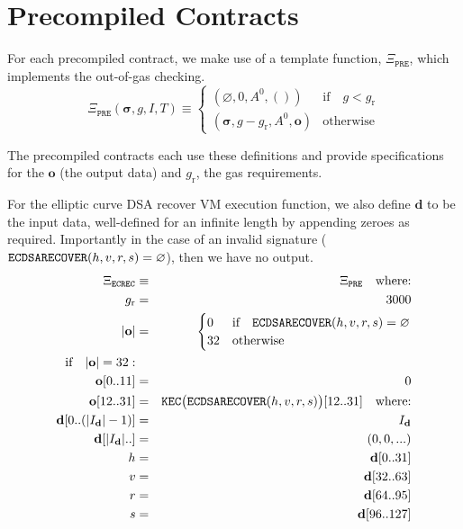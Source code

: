 \documentclass[9pt,oneside]{amsart}
\begin{document}
\section{Precompiled Contracts}\label{app:precompiled}

For each precompiled contract, we make use of a template function, $\Xi_{\mathtt{PRE}}$, which implements the out-of-gas checking.
\begin{equation} \label{eq:pre}
\Xi_{\mathtt{PRE}}(\boldsymbol{\sigma}, g, I, T) \equiv \begin{cases}
(\varnothing, 0, A^0, ()) & \text{if} \quad g < g_{\mathrm{r}} \\
(\boldsymbol\sigma, g - g_{\mathrm{r}}, A^0, \mathbf{o}) & \text{otherwise}\end{cases}
\end{equation}

The precompiled contracts each use these definitions and provide specifications for the $\mathbf{o}$ (the output data) and $g_{\mathrm{r}}$, the gas requirements.

For the elliptic curve DSA recover VM execution function, we also define $\mathbf{d}$ to be the input data, well-defined for an infinite length by appending zeroes as required. Importantly in the case of an invalid signature ($\mathtt{\tiny ECDSARECOVER}(h, v, r, s) = \varnothing$), then we have no output.
\begin{eqnarray}
\Xi_{\mathtt{ECREC}} &\equiv& \Xi_{\mathtt{PRE}} \quad \text{where:} \\
g_{\mathrm{r}} &=& 3000\\
|\mathbf{o}| &=& \begin{cases} 0 & \text{if} \quad \mathtt{\tiny ECDSARECOVER}(h, v, r, s) = \varnothing\\ 32 & \text{otherwise} \end{cases}\\
\text{if} \quad |\mathbf{o}| = 32: &&\\
\mathbf{o}[0..11] &=& 0 \\
\mathbf{o}[12..31] &=& \mathtt{\tiny KEC}\big(\mathtt{\tiny ECDSARECOVER}(h, v, r, s)\big)[12..31] \quad \text{where:}\\
\mathbf{d}[0..(|I_{\mathbf{d}}|-1)] &=& I_{\mathbf{d}}\\
\mathbf{d}[|I_{\mathbf{d}}|..] &=& (0, 0, ...) \\
h &=& \mathbf{d}[0..31]\\
v &=& \mathbf{d}[32..63]\\
r &=& \mathbf{d}[64..95]\\
s &=& \mathbf{d}[96..127]
\end{eqnarray}
\end{document}
